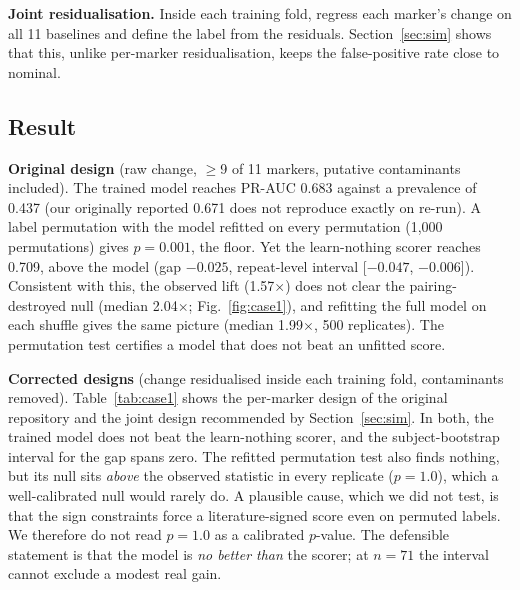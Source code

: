 \documentclass[conference]{IEEEtran}
\newcommand{\verified}[1]{#1}  %
\begin{document}
\textbf{Joint residualisation.} Inside each training fold, regress each
marker's change on all 11 baselines and define the label from the residuals.
Section~\ref{sec:sim} shows that this, unlike per-marker residualisation,
keeps the false-positive rate close to nominal.

\subsection{Result}
\textbf{Original design} (raw change, $\geq$9 of 11 markers, putative
contaminants included). The trained model reaches PR-AUC \verified{0.683}
against a prevalence of \verified{0.437} (our originally reported
\verified{0.671} does not reproduce exactly on re-run). A label permutation
with the model refitted on every permutation (1{,}000 permutations) gives
$p=\verified{0.001}$, the floor. Yet the learn-nothing scorer reaches
\verified{0.709}, above the model (gap \verified{$-0.025$}, repeat-level
interval [\verified{$-0.047$}, \verified{$-0.006$}]). Consistent with this,
the observed lift (\verified{1.57$\times$}) does not clear the
pairing-destroyed null (median \verified{2.04$\times$}; Fig.~\ref{fig:case1}),
and refitting the full model on each shuffle gives the same picture (median
\verified{1.99$\times$}, 500 replicates). The permutation test certifies a
model that does not beat an unfitted score.

\textbf{Corrected designs} (change residualised inside each training fold,
contaminants removed). Table~\ref{tab:case1} shows the per-marker design of
the original repository and the joint design recommended by
Section~\ref{sec:sim}. In both, the trained model does not beat the
learn-nothing scorer, and the subject-bootstrap interval for the gap spans
zero. The refitted permutation test also finds nothing, but its null sits
\emph{above} the observed statistic in every replicate ($p=1.0$), which a
well-calibrated null would rarely do. A plausible cause, which we did not
test, is that the sign constraints force a literature-signed score even on
permuted labels. We therefore do not read $p=1.0$ as a calibrated $p$-value.
The defensible statement is that the model is \emph{no better than} the
scorer; at $n=71$ the interval cannot exclude a modest real gain.
\end{document}
